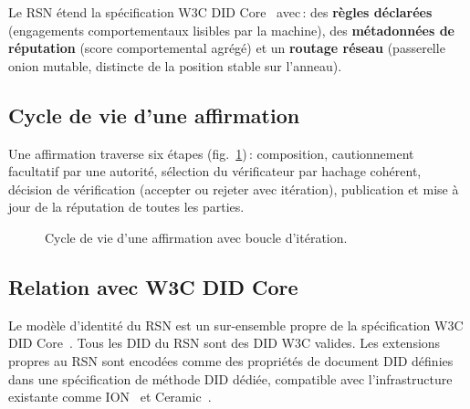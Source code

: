 \documentclass[11pt,a4paper,twocolumn]{article}
\begin{document}
Le RSN étend la spécification W3C DID Core~\cite{did2022} avec\,: des \textbf{règles déclarées} (engagements comportementaux lisibles par la machine), des \textbf{métadonnées de réputation} (score comportemental agrégé) et un \textbf{routage réseau} (passerelle onion mutable, distincte de la position stable sur l'anneau).

\subsection{Cycle de vie d'une affirmation}

Une affirmation traverse six étapes (fig.~\ref{fig:lifecycle})\,: composition, cautionnement facultatif par une autorité, sélection du vérificateur par hachage cohérent, décision de vérification (accepter ou rejeter avec itération), publication et mise à jour de la réputation de toutes les parties.

\begin{figure}[ht]
\centering
{}
\caption{Cycle de vie d'une affirmation avec boucle d'itération.}
\label{fig:lifecycle}
\end{figure}

\subsection{Relation avec W3C DID Core}

Le modèle d'identité du RSN est un sur-ensemble propre de la spécification W3C DID Core~\cite{did2022}. Tous les DID du RSN sont des DID W3C valides. Les extensions propres au RSN sont encodées comme des propriétés de document DID définies dans une spécification de méthode DID dédiée, compatible avec l'infrastructure existante comme ION~\cite{buchner2021} et Ceramic~\cite{ceramic2023}.
\end{document}
